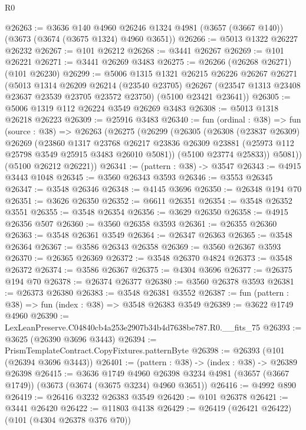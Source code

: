 \begin{lexlean}{R0}
\begin{coremodule}
@26263 := @3636
    @140
    @4960
    @26246
    @1324
    @4981
    (@3657 (@3667 @140))
    (@3673 (@3674 (@3675 @1324) @4960 @3651))
@26266 := @5013 @1322 @26227 @26232
@26267 := @101 @26212
@26268 := @3441 @26267
@26269 := @101 @26221
@26271 := @3441 @26269 @3483
@26275 := @26266 (@26268 @26271) (@101 @26230)
@26299 := @5006
    @1315
    @1321
    @26215
    @26226
    @26267
    @26271
    (@5013
      @1314
      @26209
      @26214
      (@23540 @23705)
      @26267
      (@23547 @1313 @23408 @23637 @23539 @23705 @23572 @23750)
      (@5100 @23421 @23641))
@26305 := @5006 @1319 @112 @26224 @3549 @26269 @3483
@26308 := @5013 @1318 @26218 @26223
@26309 := @25916 @3483
@26340 := fun (ordinal : @38) =>
  fun (source : @38) =>
  @26263
    (@26275
      (@26299
        (@26305
          (@26308
            (@23837 @26309)
            @26269
            (@23860
              @1317
              @23768
              @26217
              @23836
              @26309
              @23881
              (@25973 @112 @25798 @3549 @25915 @3483 @26010 @5081))
            (@5100 @23774 @25833))
          @5081))
      (@5100 @26212 @26221))
@26341 := (pattern : @38) -> @3547
@26343 := @4915 @3443 @1048
@26345 := @3560 @26343 @3593
@26346 := @3553 @26345
@26347 := @3548 @26346
@26348 := @4145 @3696
@26350 := @26348 @194 @70
@26351 := @3626 @26350
@26352 := @6611 @26351
@26354 := @3548 @26352 @3551
@26355 := @3548 @26354
@26356 := @3629 @26350
@26358 := @4915 @26356 @507
@26360 := @3560 @26358 @3593
@26361 := @26355 @26360
@26363 := @3548 @26361 @3549
@26364 := @26347 @26363
@26365 := @3548 @26364
@26367 := @3586 @26343 @26358
@26369 := @3560 @26367 @3593
@26370 := @26365 @26369
@26372 := @3548 @26370 @4824
@26373 := @3548 @26372
@26374 := @3586 @26367
@26375 := @4304 @3696
@26377 := @26375 @194 @70
@26378 := @26374 @26377
@26380 := @3560 @26378 @3593
@26381 := @26373 @26380
@26383 := @3548 @26381 @3552
@26387 := fun (pattern : @38) => fun (index : @38) => @3548 @26383 @3549
@26389 := @3622 @1749 @4960
@26390 := LexLeanPreserve.C04840cb4a253e2907b34b4d7638be787.R0.__fits_75
@26393 := @3625 (@26390 @3696 @3443)
@26394 := PrismTemplateContract.CopyFixtures.patternByte
@26398 := @26393 (@101 (@26394 @3696 @3443))
@26401 := (pattern : @38) -> (index : @38) -> @26389 @26398
@26415 := @3636
    @1749
    @4960
    @26398
    @3234
    @4981
    (@3657 (@3667 @1749))
    (@3673 (@3674 (@3675 @3234) @4960 @3651))
@26416 := @4992 @890
@26419 := @26416 @3232 @26383 @3549
@26420 := @101 @26378
@26421 := @3441 @26420
@26422 := @11803 @4138
@26429 := @26419 (@26421 @26422) (@101 (@4304 @26378 @376 @70))

\end{coremodule}
\end{lexlean}
